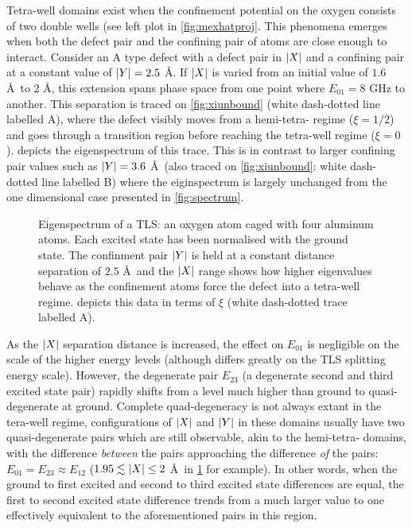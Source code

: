 Tetra-well domains exist when the confinement potential on the oxygen consists of two double wells (see left plot in \cref{fig:mexhatproj}.
This phenomena emerges when both the defect pair and the confining pair of atoms are close enough to interact.
Consider an A type defect with a defect pair in $\lvert X\rvert$ and a confining pair at a constant value of $\lvert Y\rvert = 2.5$ \AA.
If $\lvert X\rvert$ is varied from an initial value of $1.6$ \AA\ to $2$ \AA, this extension spans phase space from one point where $E_{01} = 8$ GHz to another.
This separation is traced on \cref{fig:xiunbound} (white dash-dotted line labelled A), where the defect visibly moves from a hemi-tetra- regime ($\xi = 1/2$) and goes through a transition region before reaching the tetra-well regime ($\xi = 0$).
 depicts the eigenspectrum of this trace.
This is in contrast to larger confining pair values such as $\lvert Y\rvert = 3.6$ \AA\ (also traced on \cref{fig:xiunbound}: white dash-dotted line labelled B) where the eiginspectrum is largely unchanged from the one dimensional case presented in \cref{fig:spectrum}.

\begin{figure}[htp]
  \resizebox{0.9\textwidth}{!}{}
  \caption[Eigenspectrum of a  TLS]{\label{fig:tetraspectrum}Eigenspectrum of a  TLS: an oxygen atom caged with four aluminum atoms. Each excited state has been normalised with the ground state. The confinment pair $\lvert Y\rvert$ is held at a constant distance separation of $2.5$ \AA\ and the $\lvert X\rvert$ range shows how higher eigenvalues behave as the confinement atoms force the defect into a tetra-well regime.  depicts this data in terms of $\xi$ (white dash-dotted trace labelled A). }
\end{figure}

As the $\lvert X\rvert$ separation distance is increased, the effect on $E_{01}$ is negligible on the scale of the higher energy levels (although differs greatly on the TLS splitting energy scale).
However, the degenerate pair $E_{23}$ (a degenerate second and third excited state pair) rapidly shifts from a level much higher than ground to quasi-degenerate at ground.
Complete quad-degeneracy is not always extant in the tera-well regime, configurations of $\lvert X\rvert$ and $\lvert Y\rvert$ in these domains usually have two quasi-degenerate pairs which are still observable, akin to the hemi-tetra- domains, with the difference \textit{between} the pairs approaching the difference \textit{of} the pairs: $E_{01} = E_{23} \approx E_{12}$ ($1.95 \lesssim \lvert X\rvert \leq 2$ \AA\ in \cref{fig:tetraspectrum} for example).
In other words, when the ground to first excited and second to third excited state differences are equal, the first to second excited state difference trends from a much larger value to one effectively equivalent to the aforementioned pairs in this region.


